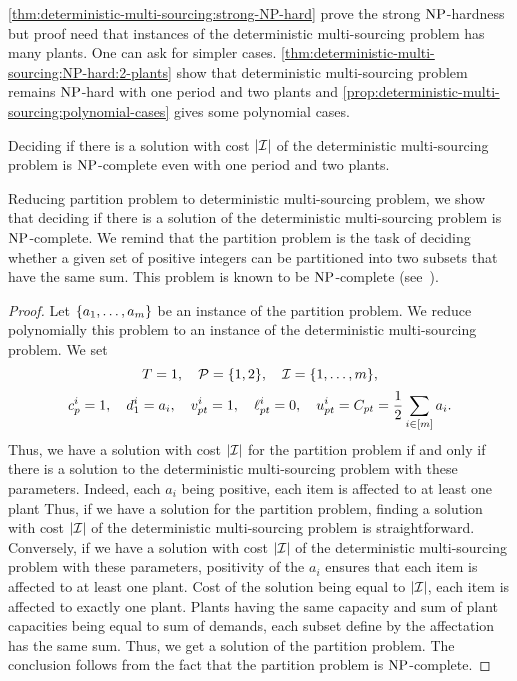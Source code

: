 \cref{thm:deterministic-multi-sourcing:strong-NP-hard} prove the strong $\operatorname{NP}$-hardness but proof need that instances of the deterministic multi-sourcing problem has many plants.
One can ask for simpler cases.
\cref{thm:deterministic-multi-sourcing:NP-hard:2-plants} show that deterministic multi-sourcing problem remains $\operatorname{NP}$-hard with one period and two plants and \cref{prop:deterministic-multi-sourcing:polynomial-cases} gives some polynomial cases.


\begin{thm}\label{thm:deterministic-multi-sourcing:NP-hard:2-plants}
Deciding if there is a solution with cost $\card{\REF}$ of the deterministic multi-sourcing problem is $\operatorname{NP}$-complete even with one period and two plants.
\end{thm}


Reducing partition problem to deterministic multi-sourcing problem, we show that deciding if there is a solution of the deterministic multi-sourcing problem is $\operatorname{NP}$-complete. We remind that the partition problem is the task of deciding whether a given set of positive integers can be partitioned into two subsets that have the same sum. This problem is known to be $\operatorname{NP}$-complete (see~\cite{Garey1979}).


\begin{proof}
Let $\crbracket{a_1,\ldots,a_m}$ be an instance of the partition problem.
We reduce polynomially this problem to an instance of the deterministic multi-sourcing problem.
We set
$$
  \horizon=1
  ,\quad
  \plants=\crbracket{1,2}
  ,\quad
  \REF=\range[1]{m},
$$
$$
  \affect_p^i=1
  ,\quad
  \demand_1^i=a_i
  ,\quad
  \rate_{pt}^i=1
  ,\quad
  \lb_{pt}^i=0
  ,\quad
  \ub_{pt}^i=\capacity_{pt}=\frac{1}{2}\sum_{i\in\range{m}}a_i.
$$
Thus, we have a solution with cost $\card{\REF}$ for the partition problem if and only if there is a solution to the deterministic multi-sourcing problem with these parameters.
Indeed, each $a_i$ being positive, each item is affected to at least one plant
Thus, if we have a solution for the partition problem, finding a solution with cost $\card{\REF}$ of the deterministic multi-sourcing problem is straightforward.
Conversely, if we have a solution with cost $\card{\REF}$ of the deterministic multi-sourcing problem with these parameters, positivity of the $a_i$ ensures that each item is affected to at least one plant.
Cost of the solution being equal to $\card{\REF}$, each item is affected to exactly one plant.
Plants having the same capacity and sum of plant capacities being equal to sum of demands, each subset define by the affectation has the same sum.
Thus, we get a solution of the partition problem.
The conclusion follows from the fact that the partition problem is $\operatorname{NP}$-complete.
\end{proof}


